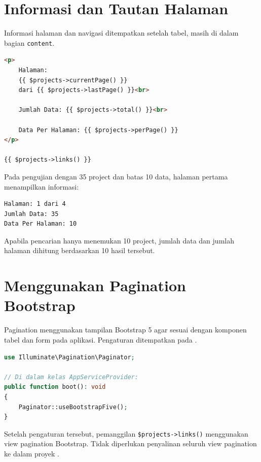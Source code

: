 \documentclass[a4paper,oneside,11pt]{book}
\renewcommand{\_}{\textunderscore\allowbreak{}}
\begin{document}
\section{Informasi dan Tautan Halaman}

Informasi halaman dan navigasi ditempatkan setelah tabel, masih di
dalam bagian \texttt{content}.

\begin{lstlisting}[language=HTML,caption={Informasi halaman dan tautan navigasi}]
<p>
    Halaman:
    {{ $projects->currentPage() }}
    dari {{ $projects->lastPage() }}<br>

    Jumlah Data: {{ $projects->total() }}<br>

    Data Per Halaman: {{ $projects->perPage() }}
</p>

{{ $projects->links() }}
\end{lstlisting}

Pada pengujian dengan 35 project dan batas 10 data, halaman pertama
menampilkan informasi:

\begin{lstlisting}[language={},caption={Informasi pada basis data pengujian}]
Halaman: 1 dari 4
Jumlah Data: 35
Data Per Halaman: 10
\end{lstlisting}

Apabila pencarian hanya menemukan 10 project, jumlah data dan jumlah
halaman dihitung berdasarkan 10 hasil tersebut.

\section{Menggunakan Pagination Bootstrap}

Pagination menggunakan tampilan Bootstrap 5 agar sesuai dengan
komponen tabel dan form pada aplikasi.
Pengaturan ditempatkan pada
.

\begin{lstlisting}[language=PHP,caption={Pengaturan pagination Bootstrap}]
use Illuminate\Pagination\Paginator;

// Di dalam kelas AppServiceProvider:
public function boot(): void
{
    Paginator::useBootstrapFive();
}
\end{lstlisting}

Setelah pengaturan tersebut, pemanggilan
\texttt{\$projects->links()} menggunakan view pagination Bootstrap.
Tidak diperlukan penyalinan seluruh view pagination ke dalam proyek \cite{laravel-pagination}.
\end{document}
